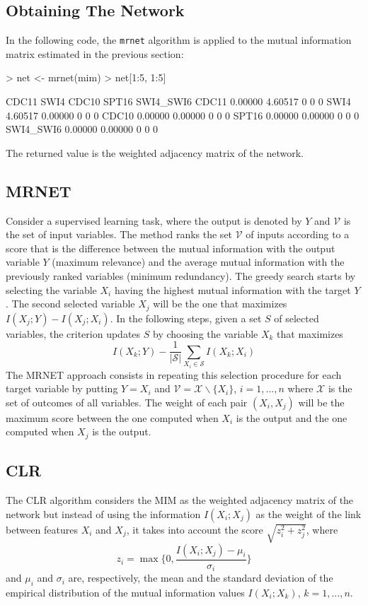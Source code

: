 \documentclass{article}
\newcommand{\Rfunction}[1]{{\texttt{#1}}}
\begin{document}
\subsection{Obtaining The Network}
In the following code, the \Rfunction{mrnet} algorithm is applied to the mutual
information matrix estimated in the previous section:
\begin{Schunk}
\begin{Sinput}
> net <- mrnet(mim)
> net[1:5, 1:5]
\end{Sinput}
\begin{Soutput}
            CDC11    SWI4 CDC10 SPT16 SWI4_SWI6
CDC11     0.00000 4.60517     0     0         0
SWI4      4.60517 0.00000     0     0         0
CDC10     0.00000 0.00000     0     0         0
SPT16     0.00000 0.00000     0     0         0
SWI4_SWI6 0.00000 0.00000     0     0         0
\end{Soutput}
\end{Schunk}
The returned value is the weighted adjacency matrix of the network.

\subsection{MRNET}
      Consider a supervised learning task, where the output is denoted by $Y$
      and $\mathcal{V}$ is the set of input variables. The method ranks the set 
      $\mathcal{V}$ of inputs according to a score that is the difference between 
      the mutual information with the output variable $Y$ (maximum relevance) 
      and the average mutual information with the previously ranked variables
      (minimum redundancy).
      The greedy search starts by selecting the variable $X_i$ having the highest
      mutual information with the target $Y$. The second selected variable $X_j$
      will be the one that maximizes $I(X_j;Y)-I(X_j;X_i)$. 
      In the following steps, given a set $S$ of selected variables, the criterion 
      updates $S$ by choosing the variable $X_k$ that maximizes 
      $$ I(X_k;Y) - \frac{1}{|\mathcal{S}|}\sum_{X_i \in \mathcal{S}} I(X_k;X_i)$$
      The MRNET approach consists in repeating this selection procedure for 
      each target variable by putting $Y=X_i$ and 
      $\mathcal{V}=\mathcal{X}\backslash\lbrace X_i\rbrace$,
      $i=1,...,n$ where $\mathcal{X}$ is the set of outcomes of all variables.
      The weight of each pair $(X_i,X_j)$ will be the maximum score between the one 
      computed when $X_i$ is the output and the one computed when $X_j$ is 
      the output.
\subsection{CLR}
	  The CLR algorithm considers the MIM as the weighted adjacency matrix of the network 
	  but instead of using the information $I(X_i;X_j)$ as the weight of the link between features
      $X_i$ and $X_j$, it takes into account the score 
      $\sqrt{z_i^2+z_j^2}$, where 
      $$ z_i = \max \bigg\lbrace 0, \frac{I(X_i;X_j)-\mu_i}{\sigma_i} \bigg\rbrace $$
	  and $\mu_i$ and $\sigma_i$ are, respectively, 
      the mean and the standard deviation of the empirical distribution 
      of the mutual information values $I(X_i;X_k)$, $k=1,...,n$.
\end{document}
